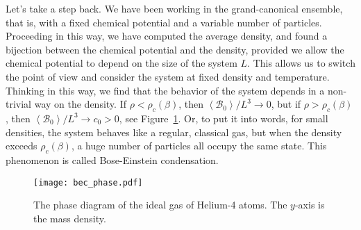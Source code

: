 \documentclass{ian}
\begin{document}
\indent
Let's take a step back.
We have been working in the grand-canonical ensemble, that is, with a fixed chemical potential and a variable number of particles.
Proceeding in this way, we have computed the average density, and found a bijection between the chemical potential and the density, provided we allow the chemical potential to depend on the size of the system $L$.
This allows us to switch the point of view and consider the system at fixed density and temperature.
Thinking in this way, we find that the behavior of the system depends in a non-trivial way on the density.
If $\rho<\rho_c(\beta)$, then $\left<\mathcal B_0\right>/L^3\to0$, but if $\rho>\rho_c(\beta)$, then $\left<\mathcal B_0\right>/L^3\to c_0>0$, see Figure\-~\ref{fig:phase}.
Or, to put it into words, for small densities, the system behaves like a regular, classical gas, but when the density exceeds $\rho_c(\beta)$, a huge number of particles all occupy the same state.
This phenomenon is called Bose-Einstein condensation.

\begin{figure}
  \hfil\texttt{[image: bec\_phase.pdf]}
  \caption{The phase diagram of the ideal gas of Helium-4 atoms.
  The $y$-axis is the mass density.}
  \label{fig:phase}
\end{figure}
\bigskip
\end{document}

